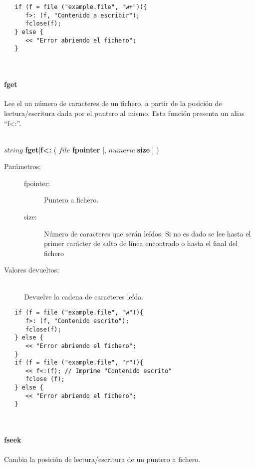 \begin{lstlisting}  
   if (f = file ("example.file", "w+")){
      f>: (f, "Contenido a escribir"); 
      fclose(f);
   } else {
      << "Error abriendo el fichero";
   }
\end{lstlisting}
\hfill\\ 

\paragraph{fget}
Lee el un número de caracteres de un fichero, a partir de la posición de lectura/escritura dada por el puntero al mismo. Esta función presenta un alias ``f<:''.

\hfill \\ $string$ \textbf{fget}|\textbf{f<:} ( $file$ \textbf{fpointer} [, $numeric$ \textbf{size} ]  )  
\begin{description}
\item [Parámetros:] \hfill 
   \begin{description}
   \item[fpointer:] Puntero a fichero. 
   \item[size:] Número de caracteres que serán leídos. Si no es dado se lee hasta el primer carácter de salto de línea encontrado o hasta el final del fichero 
   \end{description}
\item[Valores devueltos:] \hfill \\
   Devuelve la cadena de caracteres leída.
\end{description}

\begin{lstlisting}  
   if (f = file ("example.file", "w")){
      f>: (f, "Contenido escrito"); 
      fclose(f);
   } else {
      << "Error abriendo el fichero";
   }
   if (f = file ("example.file", "r")){
      << f<:(f); // Imprime "Contenido escrito"
      fclose (f);
   } else {
      << "Error abriendo el fichero";
   }
\end{lstlisting}
\hfill\\ 

\paragraph{fseek}
Cambia la posición de lectura/escritura de un puntero a fichero.

